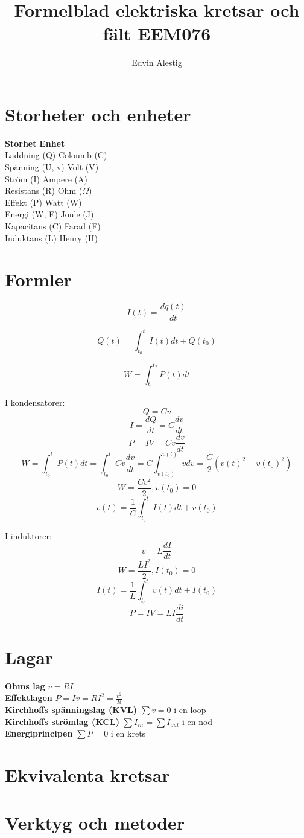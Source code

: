 \documentclass{article}
\title{Formelblad elektriska kretsar och fält EEM076}
\author{Edvin Alestig}
\begin{document}
\maketitle

\section{Storheter och enheter}

\textbf{Storhet} \tab \textbf{Enhet}
\\
Laddning (Q)  \tab Coloumb (C)
\\
Spänning (U, v) \tab Volt (V)
\\
Ström (I) \tab Ampere (A)
\\
Resistans (R) \tab Ohm ($\Omega$)
\\
Effekt (P) \tab Watt (W)
\\
Energi (W, E) \tab Joule (J)
\\
Kapacitans (C) \tab Farad (F)
\\
Induktans (L) \tab Henry (H)

\section{Formler}

\[ I(t) = \frac{dq(t)}{dt} \]

\[ Q(t) = \int_{t_0}^t I(t)dt + Q(t_0) \]

\[ W = \int_{t_1}^{t_2} P(t)dt \]

I kondensatorer:
\[ Q = Cv \]
\[ I = \frac{dQ}{dt} = C \frac{dv}{dt} \]
\[ P = IV = Cv \frac{dv}{dt} \]
\[ W = \int_{t_0}^t P(t)dt = \int_{t_0}^t Cv \frac{dv}{dt} = C \int_{v(t_0)}^{v(t)} vdv = \frac{C}{2}(v(t)^2 - v(t_0)^2) \]
\[ W = \frac{Cv^2}{2}, v(t_0) = 0 \]
\[ v(t) = \frac{1}{C} \int_{t_0}^t I(t)dt + v(t_0) \]

I induktorer:
\[ v = L \frac{dI}{dt} \]
\[ W = \frac{LI^2}{2}, I(t_0) = 0 \]
\[ I(t) = \frac{1}{L} \int_{t_0}^t v(t)dt + I(t_0) \]
\[ P = IV = LI \frac{di}{dt} \]

\section{Lagar}

\textbf{Ohms lag} \tab  $ v=RI $
\\
\textbf{Effektlagen} \tab  $ P = Iv = RI^2 = \frac{v^2}{R} $
\\
\textbf{Kirchhoffs spänningslag (KVL)} \tab $ \sum v = 0 $  i en loop
\\
\textbf{Kirchhoffs strömlag (KCL)} \tab $ \sum I_{in} = \sum I_{out} $  i en nod
\\
\textbf{Energiprincipen} \tab $ \sum P = 0 $ i en krets

\section{Ekvivalenta kretsar}


\section{Verktyg och metoder}

\end{document}
